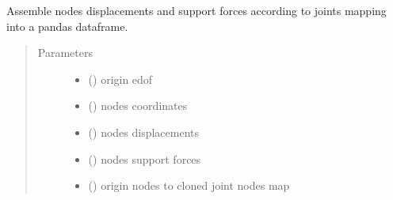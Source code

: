 \documentclass[letterpaper,10pt,english]{sphinxmanual}
\begin{document}
\begin{fulllineitems}
\label{\detokenize{api:beamon.core.assemble_nodes_results}}
Assemble nodes displacements and support forces according to joints mapping into a pandas dataframe.
\begin{quote}\begin{description}
\item[{Parameters}] \leavevmode\begin{itemize}
\item {} 
 () \textendash{} origin edof

\item {} 
 () \textendash{} nodes coordinates

\item {} 
 () \textendash{} nodes displacements

\item {} 
 () \textendash{} nodes support forces

\item {} 
 () \textendash{} origin nodes to cloned joint nodes map

\end{itemize}

\end{description}\end{quote}

\end{fulllineitems}

\end{document}
